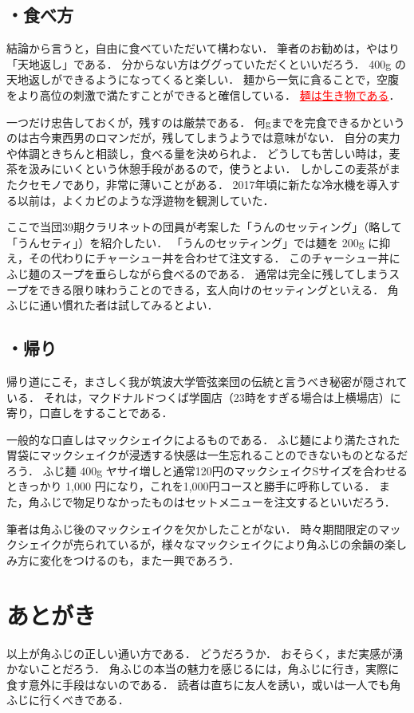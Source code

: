 \documentclass[uplatex]{jsarticle}
\begin{document}
  \subsection*{・食べ方}
  結論から言うと，自由に食べていただいて構わない．
  筆者のお勧めは，やはり「天地返し」である．
  分からない方はググっていただくといいだろう．
  400g の天地返しができるようになってくると楽しい．
  麺から一気に貪ることで，空腹をより高位の刺激で満たすことができると確信している．
  \textcolor{red}{\underline{麺は生き物である}}．

  一つだけ忠告しておくが，残すのは厳禁である．
  何gまでを完食できるかというのは古今東西男のロマンだが，残してしまうようでは意味がない．
  自分の実力や体調ときちんと相談し，食べる量を決められよ．
  どうしても苦しい時は，麦茶を汲みにいくという休憩手段があるので，使うとよい．
  しかしこの麦茶がまたクセモノであり，非常に薄いことがある．
  2017年頃に新たな冷水機を導入する以前は，よくカビのような浮遊物を観測していた．

  ここで当団39期クラリネットの団員が考案した「うんのセッティング」（略して「うんセティ」）を紹介したい．
  「うんのセッティング」では麺を 200g に抑え，その代わりにチャーシュー丼を合わせて注文する．
  このチャーシュー丼にふじ麺のスープを垂らしながら食べるのである．
  通常は完全に残してしまうスープをできる限り味わうことのできる，玄人向けのセッティングといえる．
  角ふじに通い慣れた者は試してみるとよい．


  \subsection*{・帰り}
  帰り道にこそ，まさしく我が筑波大学管弦楽団の伝統と言うべき秘密が隠されている．
  それは，マクドナルドつくば学園店（23時をすぎる場合は上横場店）に寄り，口直しをすることである．

  一般的な口直しはマックシェイクによるものである．
  ふじ麺により満たされた胃袋にマックシェイクが浸透する快感は一生忘れることのできないものとなるだろう．
  ふじ麺 400g ヤサイ増しと通常120円のマックシェイクSサイズを合わせるときっかり 1,000 円になり，これを1,000円コースと勝手に呼称している．
  また，角ふじで物足りなかったものはセットメニューを注文するといいだろう．

  筆者は角ふじ後のマックシェイクを欠かしたことがない．
  時々期間限定のマックシェイクが売られているが，様々なマックシェイクにより角ふじの余韻の楽しみ方に変化をつけるのも，また一興であろう．


 \section*{あとがき}
 以上が角ふじの正しい通い方である．
 どうだろうか．
 おそらく，まだ実感が湧かないことだろう．
 角ふじの本当の魅力を感じるには，角ふじに行き，実際に食す意外に手段はないのである．
 読者は直ちに友人を誘い，或いは一人でも角ふじに行くべきである．
\end{document}
